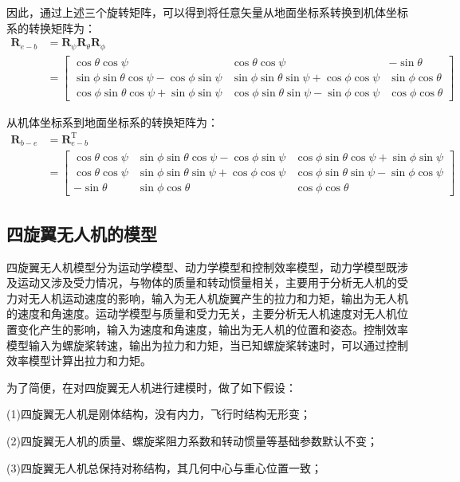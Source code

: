 \documentclass[lang=chs, degree=master, blindreview=false, winfonts=true]{yanputhesis}
\begin{document}
因此，通过上述三个旋转矩阵，可以得到将任意矢量从地面坐标系转换到机体坐标系的转换矩阵为：
$$\begin{aligned}\boldsymbol{R}_{e-b}&=\boldsymbol{R}_{\psi}\boldsymbol{R}_{\theta}\boldsymbol{R}_{\phi}\\&=\begin{bmatrix}\cos\theta\cos\psi&\cos\theta\cos\psi&-\sin\theta\\\sin\phi\sin\theta\cos\psi-\cos\phi\sin\psi&\sin\phi\sin\theta\sin\psi+\cos\phi\cos\psi&\sin\phi\cos\theta\\\cos\phi\sin\theta\cos\psi+\sin\phi\sin\psi&\cos\phi\sin\theta\sin\psi-\sin\phi\cos\psi&\cos\phi\cos\theta\end{bmatrix}\end{aligned}$$

从机体坐标系到地面坐标系的转换矩阵为：
$$\begin{aligned}\boldsymbol{R}_{b-e}&=\bm{R}_{e-b}^\mathrm{T}\\&=\begin{bmatrix}\cos\theta\cos\psi&\sin\phi\sin\theta\cos\psi-\cos\phi\sin\psi&\cos\phi\sin\theta\cos\psi+\sin\phi\sin\psi\\\cos\theta\cos\psi&\sin\phi\sin\theta\sin\psi+\cos\phi\cos\psi&\cos\phi\sin\theta\sin\psi-\sin\phi\cos\psi\\-\sin\theta&\sin\phi\cos\theta&\cos\phi\cos\theta\end{bmatrix}\end{aligned}$$

\subsection{四旋翼无人机的模型}
四旋翼无人机模型分为运动学模型、动力学模型和控制效率模型，动力学模型既涉及运动又涉及受力情况，与物体的质量和转动惯量相关，主要用于分析无人机的受力对无人机运动速度的影响，输入为无人机旋翼产生的拉力和力矩，输出为无人机的速度和角速度。运动学模型与质量和受力无关，主要分析无人机速度对无人机位置变化产生的影响，输入为速度和角速度，输出为无人机的位置和姿态。控制效率模型输入为螺旋桨转速，输出为拉力和力矩，当已知螺旋桨转速时，可以通过控制效率模型计算出拉力和力矩。

为了简便，在对四旋翼无人机进行建模时，做了如下假设：

(1)四旋翼无人机是刚体结构，没有内力，飞行时结构无形变；

(2)四旋翼无人机的质量、螺旋桨阻力系数和转动惯量等基础参数默认不变；

(3)四旋翼无人机总保持对称结构，其几何中心与重心位置一致；
\end{document}
